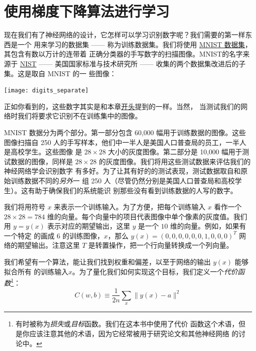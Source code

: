 \section{使用梯度下降算法进行学习}

现在我们有了神经网络的设计，它怎样可以学习识别数字呢？我们需要的第一样东西是一个
用来学习的数据集 —— 称为训练数据集。我们将使用
\href{http://yann.lecun.com/exdb/mnist/}{MNIST 数据集}，其包含有数以万计的连带着
正确分类器的手写数字的扫描图像。MNIST的名字来源于
\href{http://en.wikipedia.org/wiki/National_Institute_of_Standards_and_Technology}{NIST}
—— 美国国家标准与技术研究所 —— 收集的两个数据集改进后的子集。这是取自 MNIST 的一
些图像：
\begin{center}
  \texttt{[image: digits\_separate]}
\end{center}

正如你看到的，这些数字其实是和本章\hyperref[fig:digits]{开头}提到的一样。当然，
当测试我们的网络时我们将要求它识别不在训练集中的图像。

MNIST 数据分为两个部分。第一部分包含 60,000 幅用于训练数据的图像。这些图像扫描自
250 人的手写样本，他们中一半人是美国人口普查局的员工，一半人是高校学生。这些图像
是 $28 \times 28$ 大小的灰度图像。第二部分是 10,000 幅用于测试数据的图像，同样是
$28 \times 28$ 的灰度图像。我们将用这些测试数据来评估我们的神经网络学会识别数字
有多好。为了让其有好的的测试表现，测试数据取自和原始训练数据不同的\emph{另外}一
组 250 人（尽管仍然分别是美国人口普查局和高校学生）。这有助于确保我们的系统能识
别那些没有看到训练数据的人写的数字。

我们将用符号 $x$ 来表示一个训练输入。为了方便，把每个训练输入 $x$ 看作一个 $28
\times 28 = 784$ 维的向量。每个向量中的项目代表图像中单个像素的灰度值。我们用 $y
= y(x)$ 表示对应的期望输出，这里 $y$ 是一个 $10$ 维的向量。例如，如果有一个特定
的画成 $6$ 的训练图像，$x$，那么 $y(x) = (0, 0, 0, 0, 0, 0, 1, 0, 0, 0)^T$ %
网络的期望输出。注意这里 $T$ 是转置操作，把一个行向量转换成一个列向量。

我们希望有一个算法，能让我们找到权重和偏差，以至于网络的输出 $y(x)$ 能够拟合所有
的训练输入$x$。为了量化我们如何实现这个目标，我们定义一个\emph{代价函
  数}\footnote{有时被称为\emph{损失}或\emph{目标}函数。我们在这本书中使用了代价
  函数这个术语，但是你应该注意其他的术语，因为它经常被用于研究论文和其他神经网络
  的讨论中。}：
\begin{equation}
  C(w,b) \equiv \frac{1}{2n} \sum_x \| y(x) - a\|^2
  \label{eq:6}\tag{6}
\end{equation}

